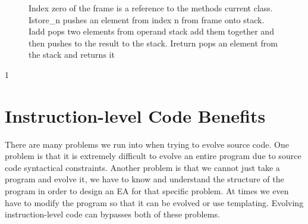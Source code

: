 \documentclass{sig-alternate}
\begin{document}
\begin{figure}
\centering
{}

\caption{Index zero of the frame is a reference to the methods current class. Istore\_n pushes an element from index n from frame onto stack. Iadd pops two elements from operand stack add them together and then pushes to the result to the stack. Ireturn pops an element from the stack and returns it}
\label{stack}
\end{figure}


           



                       1
                       



          


\section{Instruction-level Code Benefits}

There are many problems we run into when trying to evolve source code. One problem is that it is extremely difficult to evolve an entire program due to source code syntactical constraints. Another problem is that we cannot just take a program and evolve it, we have to know and understand the structure of the program in order to design an EA for that specific problem. At times we even have to modify the program so that it can be evolved or use templating. Evolving instruction-level code can bypasses both of these problems.
\end{document}
